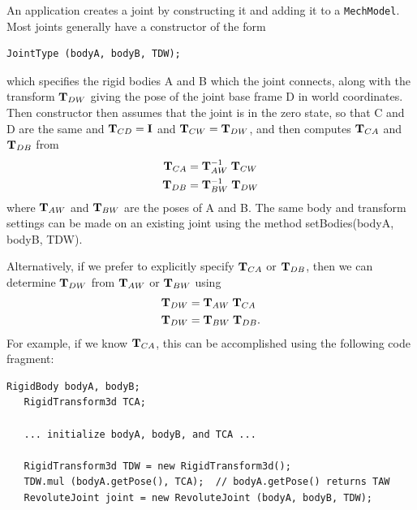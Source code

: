 An application creates a joint by constructing it and adding it to a
{\tt MechModel}. Most joints generally have a constructor of the form
%
\begin{lstlisting}[]
  JointType (bodyA, bodyB, TDW);
\end{lstlisting}
%
which specifies the rigid bodies A and B which the joint connects,
along with the transform ${\bf T}_{DW}$ giving the pose of the joint base
frame D in world coordinates. Then constructor then assumes that the
joint is in the zero state, so that C and D are the same and
${\bf T}_{CD} = {\bf I}$ and ${\bf T}_{CW} = {\bf T}_{DW}$, and then computes
${\bf T}_{CA}$ and ${\bf T}_{DB}$ from
%
\begin{align}
{\bf T}_{CA} & = {\bf T}_{AW}^{-1} \; {\bf T}_{CW} \\
{\bf T}_{DB} & = {\bf T}_{BW}^{-1} \; {\bf T}_{DW}
\end{align}
%
where ${\bf T}_{AW}$ and ${\bf T}_{BW}$ are the poses of A and B.
The same body and transform settings can be made on an existing
joint using the method
{setBodies(bodyA, bodyB, TDW)}.

Alternatively, if we prefer to explicitly specify ${\bf T}_{CA}$ or ${\bf T}_{DB}$, then we
can determine ${\bf T}_{DW}$ from ${\bf T}_{AW}$ or ${\bf T}_{BW}$ using
%
\begin{align}
{\bf T}_{DW} & = {\bf T}_{AW} \; {\bf T}_{CA} \\
{\bf T}_{DW} & = {\bf T}_{BW} \; {\bf T}_{DB}.
\end{align}
%
For example, if we know ${\bf T}_{CA}$, this can be accomplished using
the following code fragment:
%
\begin{lstlisting}[]
   RigidBody bodyA, bodyB;
   RigidTransform3d TCA;

   ... initialize bodyA, bodyB, and TCA ...
   
   RigidTransform3d TDW = new RigidTransform3d();
   TDW.mul (bodyA.getPose(), TCA);  // bodyA.getPose() returns TAW
   RevoluteJoint joint = new RevoluteJoint (bodyA, bodyB, TDW);
\end{lstlisting}
%

